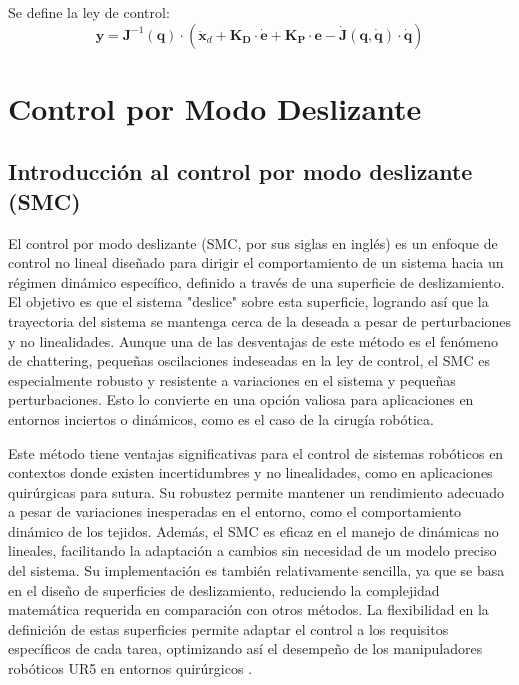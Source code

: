 Se define la ley de control:
\begin{equation}
    \boldsymbol{y} =
    \boldsymbol{J}^{-1}(\boldsymbol{q})\cdot(\boldsymbol{\ddot{x}}_d +
    \boldsymbol{K_D}\cdot\dot{\boldsymbol{e}} + \boldsymbol{K_P}\cdot
    \boldsymbol{e} -
    \dot{\boldsymbol{J}}(\boldsymbol{q,\dot{q}})\cdot\dot{\boldsymbol{q} })
\end{equation}

\section{Control por Modo Deslizante}

\subsection{Introducción al control por modo deslizante (SMC)}
El control por modo deslizante (SMC, por sus siglas en inglés) es un enfoque de
control no lineal diseñado para dirigir el comportamiento de un sistema hacia
un régimen dinámico específico, definido a través de una superficie de
deslizamiento. El objetivo es que el sistema "deslice" sobre esta superficie,
logrando así que la trayectoria del sistema se mantenga cerca de la deseada a
pesar de perturbaciones y no linealidades. Aunque una de las desventajas de
este método es el fenómeno de chattering, pequeñas oscilaciones indeseadas en
la ley de control, el SMC es especialmente robusto y resistente a variaciones
en el sistema y pequeñas perturbaciones. Esto lo convierte en una opción
valiosa para aplicaciones en entornos inciertos o dinámicos, como es el caso de
la cirugía robótica.

Este método tiene ventajas significativas para el control de sistemas robóticos
en contextos donde existen incertidumbres y no linealidades, como en
aplicaciones quirúrgicas para sutura. Su robustez permite mantener un
rendimiento adecuado a pesar de variaciones inesperadas en el entorno, como el
comportamiento dinámico de los tejidos. Además, el SMC es eficaz en el manejo
de dinámicas no lineales, facilitando la adaptación a cambios sin necesidad de
un modelo preciso del sistema. Su implementación es también relativamente
sencilla, ya que se basa en el diseño de superficies de deslizamiento,
reduciendo la complejidad matemática requerida en comparación con otros
métodos. La flexibilidad en la definición de estas superficies permite adaptar
el control a los requisitos específicos de cada tarea, optimizando así el
desempeño de los manipuladores robóticos UR5 en entornos quirúrgicos
\cite{utkin_sliding_mode_control}.

